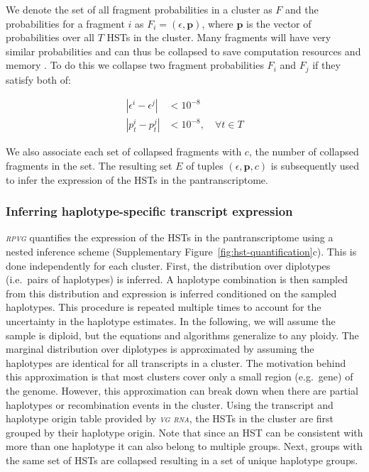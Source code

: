 \documentclass[11pt]{ucthesis}
\newcommand{\tool}[1]{\emph{\textsc{#1}}}
\begin{document}
We denote the set of all fragment probabilities in a cluster as $F$ and the probabilities for a fragment $i$ as ${F_i=\left(\epsilon,\textbf{p}\right)}$, where $\textbf{p}$ is the vector of probabilities over all $T$ HSTs in the cluster. Many fragments will have very similar probabilities and can thus be collapsed to save computation resources and memory \cite{nicolae2011estimation,patro2017salmon}. To do this we collapse two fragment probabilities $F_i$ and $F_j$ if they satisfy both of:

\begin{equation}
\begin{aligned}
    \left|\epsilon^{i}-\epsilon^{j}\right| &< 10^{-8} \\	\left|p_t^{i}-p_t^{j}\right| &< 10^{-8},\quad\forall t\in T
\end{aligned}
\end{equation}

We also associate each set of collapsed fragments with $c$, the number of collapsed fragments in the set. The resulting set $E$ of tuples ${\left(\epsilon, \textbf{p}, c\right)}$ is subsequently used to infer the expression of the HSTs in the pantranscriptome.

\subsubsection{Inferring haplotype-specific transcript expression}

\tool{rpvg} quantifies the expression of the HSTs in the pantranscriptome using a nested inference scheme (Supplementary Figure~\ref{fig:hst-quantification}c). This is done independently for each cluster. First, the distribution over diplotypes (i.e.\ pairs of haplotypes) is inferred. A haplotype combination is then sampled from this distribution and expression is inferred conditioned on the sampled haplotypes. This procedure is repeated multiple times to account for the uncertainty in the haplotype estimates. In the following, we will assume the sample is diploid, but the equations and algorithms generalize to any ploidy.
\newline 
\newline
The marginal distribution over diplotypes is approximated by assuming the haplotypes are identical for all transcripts in a cluster. The motivation behind this approximation is that most clusters cover only a small region (e.g.\ gene) of the genome. However, this approximation can break down when there are partial haplotypes or recombination events in the cluster. Using the transcript and haplotype origin table provided by \tool{vg rna}, the HSTs in the cluster are first grouped by their haplotype origin. Note that since an HST can be consistent with more than one haplotype it can also belong to multiple groups. Next, groups with the same set of HSTs are collapsed resulting in a set of unique haplotype groups. 
\end{document}
